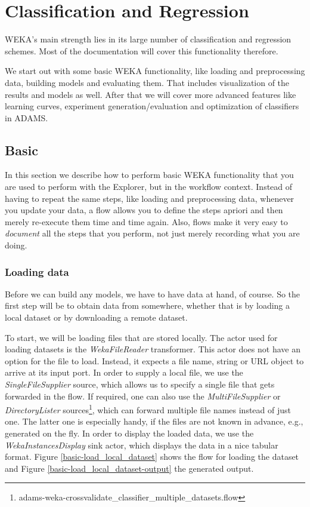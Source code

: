 
\chapter{Classification and Regression}
\label{classification_and_regression}
WEKA's main strength lies in its large number of classification and regression
schemes. Most of the documentation will cover this functionality therefore.

We start out with some basic WEKA functionality, like loading and
preprocessing data, building models and evaluating them. That includes
visualization of the results and models as well. After that we will cover more
advanced features like learning
curves, experiment generation/evaluation and optimization of classifiers in ADAMS.

\newpage
\section{Basic}
In this section we describe how to perform basic WEKA functionality that you are
used to perform with the Explorer, but in the workflow context. Instead of
having to repeat the same steps, like loading and preprocessing data, whenever
you update your data, a flow allows you to define the steps apriori and then merely
re-execute them time and time again. Also, flows make it very easy to
\textit{document} all the steps that you perform, not just merely recording what
you are doing.

\subsection{Loading data}
Before we can build any models, we have to have data at hand, of course. So the
first step will be to obtain data from somewhere, whether that is by loading a
local dataset or by downloading a remote dataset.

To start, we will be loading files that are stored locally. The actor used for
loading datasets is the \textit{WekaFileReader} transformer. This actor does not
have an option for the file to load. Instead, it expects a file name, string or
URL object to arrive at its input port. In order to supply a local file, we use
the \textit{SingleFileSupplier} source, which allows us to specify a single file
that gets forwarded in the flow. If required, one can also use the
\textit{MultiFileSupplier} or \textit{DirectoryLister}
sources\footnote{adams-weka-crossvalidate\_classifier\_multiple\_datasets.flow},
which can forward multiple file names instead of just one. The latter one is
especially handy, if the files are not known in advance, e.g., generated on the
fly. In order to display the loaded data, we use the
\textit{WekaInstancesDisplay} sink actor, which displays the data in a nice
tabular format. Figure \ref{basic-load_local_dataset} shows the flow for loading
the dataset and Figure \ref{basic-load_local_dataset-output} the generated
output.

